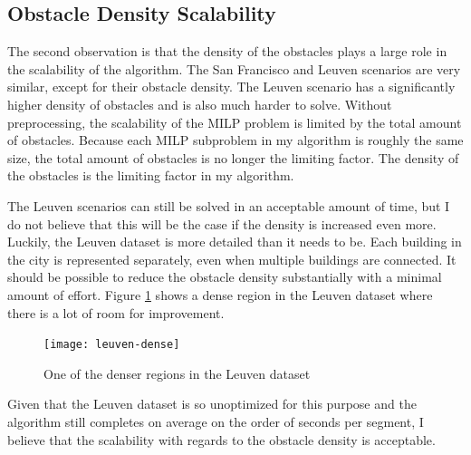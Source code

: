 \subsection{Obstacle Density Scalability}
The second observation is that the density of the obstacles plays a large role in the scalability of the algorithm. The San Francisco and Leuven scenarios are very similar, except for their obstacle density. The Leuven scenario has a significantly higher density of obstacles and is also much harder to solve. Without preprocessing, the scalability of the MILP problem is limited by the total amount of obstacles. Because each MILP subproblem in my algorithm is roughly the same size, the total amount of obstacles is no longer the limiting factor. The density of the obstacles is the limiting factor in my algorithm.
\par
The Leuven scenarios can still be solved in an acceptable amount of time, but I do not believe that this will be the case if the density is increased even more. Luckily, the Leuven dataset is more detailed than it needs to be. Each building in the city is represented separately, even when multiple buildings are connected. It should be possible to reduce the obstacle density substantially with a minimal amount of effort. Figure \ref{fig:leuven-dense2} shows a dense region in the Leuven dataset where there is a lot of room for improvement.

\begin{figure}[h]
	\centering
	\texttt{[image: leuven-dense]}
	\caption{One of the denser regions in the Leuven dataset}
	\label{fig:leuven-dense2}
\end{figure}

Given that the Leuven dataset is so unoptimized for this purpose and the algorithm still completes on average on the order of seconds per segment, I believe that the scalability with regards to the obstacle density is acceptable.


